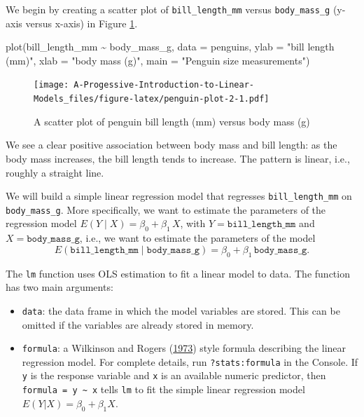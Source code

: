 \documentclass[
]{book}
\newenvironment{Shaded}{\begin{snugshade}}{\end{snugshade}}
\newcommand{\AttributeTok}[1]{\textcolor[rgb]{0.77,0.63,0.00}{#1}}
\newcommand{\FunctionTok}[1]{\textcolor[rgb]{0.00,0.00,0.00}{#1}}
\newcommand{\NormalTok}[1]{#1}
\newcommand{\SpecialCharTok}[1]{\textcolor[rgb]{0.00,0.00,0.00}{#1}}
\newcommand{\StringTok}[1]{\textcolor[rgb]{0.31,0.60,0.02}{#1}}
\providecommand{\tightlist}{%
  \setlength{\itemsep}{0pt}\setlength{\parskip}{0pt}}
\theoremstyle{definition}
\theoremstyle{definition}
\theoremstyle{definition}
\theoremstyle{definition}
\theoremstyle{remark}
\begin{document}
We begin by creating a scatter plot of \texttt{bill\_length\_mm} versus \texttt{body\_mass\_g} (y-axis versus x-axis) in Figure \ref{fig:penguin-plot-2}.

\begin{Shaded}
\begin{Highlighting}[]
\FunctionTok{plot}\NormalTok{(bill\_length\_mm }\SpecialCharTok{\textasciitilde{}}\NormalTok{ body\_mass\_g, }\AttributeTok{data =}\NormalTok{ penguins,}
     \AttributeTok{ylab =} \StringTok{"bill length (mm)"}\NormalTok{, }\AttributeTok{xlab =} \StringTok{"body mass (g)"}\NormalTok{,}
     \AttributeTok{main =} \StringTok{"Penguin size measurements"}\NormalTok{)}
\end{Highlighting}
\end{Shaded}

\begin{figure}
\centering
\texttt{[image: A-Progessive-Introduction-to-Linear-Models\_files/figure-latex/penguin-plot-2-1.pdf]}
\caption{\label{fig:penguin-plot-2}A scatter plot of penguin bill length (mm) versus body mass (g)}
\end{figure}

We see a clear positive association between body mass and bill length: as the body mass increases, the bill length tends to increase. The pattern is linear, i.e., roughly a straight line.

We will build a simple linear regression model that regresses \texttt{bill\_length\_mm} on \texttt{body\_mass\_g}. More specifically, we want to estimate the parameters of the regression model \(E(Y\mid X)=\beta_0+\beta_1\,X\), with \(Y=\mathtt{bill\_length\_mm}\) and \(X=\mathtt{body\_mass\_g}\), i.e., we want to estimate the parameters of the model
\[
E(\mathtt{bill\_length\_mm}\mid \mathtt{body\_mass\_g})=\beta_0+\beta_1\,\mathtt{body\_mass\_g}.
\]

The \texttt{lm} function uses OLS estimation to fit a linear model to data. The function has two main arguments:

\begin{itemize}
\tightlist
\item
  \texttt{data}: the data frame in which the model variables are stored. This can be omitted if the variables are already stored in memory.
\item
  \texttt{formula}: a Wilkinson and Rogers (\protect\hyperlink{ref-wilkinsonrogers1973}{1973}) style formula describing the linear regression model. For complete details, run \texttt{?stats:formula} in the Console. If \texttt{y} is the response variable and \texttt{x} is an available numeric predictor, then \texttt{formula\ =\ y\ \textasciitilde{}\ x} tells \texttt{lm} to fit the simple linear regression model \(E(Y|X)=\beta_0+\beta_1 X\).
\end{itemize}
\end{document}

